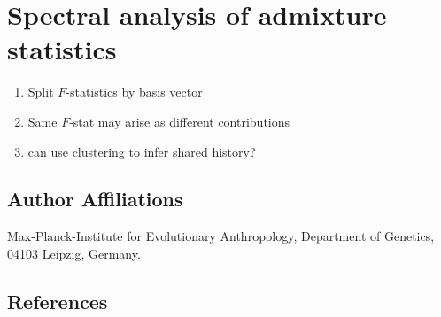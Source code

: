 \documentclass[9pt,twocolumn,twoside,lineno]{pnas-new}
\begin{document}
\section{Spectral analysis of admixture statistics}
\begin{enumerate}
    \item Split $F$-statistics by basis vector
    \item Same $F$-stat may arise as different contributions
    \item can use clustering to infer shared history?
\end{enumerate}




\subsection*{Author Affiliations}

Max-Planck-Institute for Evolutionary Anthropology, Department of Genetics, 04103 Leipzig, Germany.

\subsection*{References}



\end{document}
